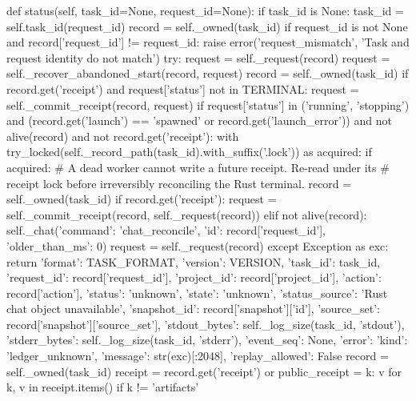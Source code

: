    def status(self, task_id=None, request_id=None):
        if task_id is None:
            task_id = self.task_id(request_id)
        record = self._owned(task_id)
        if request_id is not None and record['request_id'] != request_id:
            raise error('request_mismatch', 'Task and request identity do not match')
        try:
            request = self._request(record)
            request = self._recover_abandoned_start(record, request)
            record = self._owned(task_id)
            if record.get('receipt') and request['status'] not in TERMINAL:
                request = self._commit_receipt(record, request)
            if request['status'] in ('running', 'stopping') and (record.get('launch') == 'spawned' or record.get('launch_error')) and not alive(record) and not record.get('receipt'):
                with try_locked(self._record_path(task_id).with_suffix('.lock')) as acquired:
                    if acquired:
                        # A dead worker cannot write a future receipt. Re-read under its
                        # receipt lock before irreversibly reconciling the Rust terminal.
                        record = self._owned(task_id)
                        if record.get('receipt'):
                            request = self._commit_receipt(record, self._request(record))
                        elif not alive(record):
                            self._chat({'command': 'chat_reconcile', 'id': record['request_id'], 'older_than_ms': 0})
                            request = self._request(record)
        except Exception as exc:
            return {'format': TASK_FORMAT, 'version': VERSION, 'task_id': task_id,
                    'request_id': record['request_id'], 'project_id': record['project_id'], 'action': record['action'],
                    'status': 'unknown', 'state': 'unknown', 'status_source': 'Rust chat object unavailable',
                    'snapshot_id': record['snapshot']['id'], 'source_set': record['snapshot']['source_set'],
                    'stdout_bytes': self._log_size(task_id, 'stdout'), 'stderr_bytes': self._log_size(task_id, 'stderr'),
                    'event_seq': None, 'error': {'kind': 'ledger_unknown', 'message': str(exc)[:2048]}, 'replay_allowed': False}
        record = self._owned(task_id)
        receipt = record.get('receipt') or {}
        public_receipt = {k: v for k, v in receipt.items() if k != 'artifacts'}
